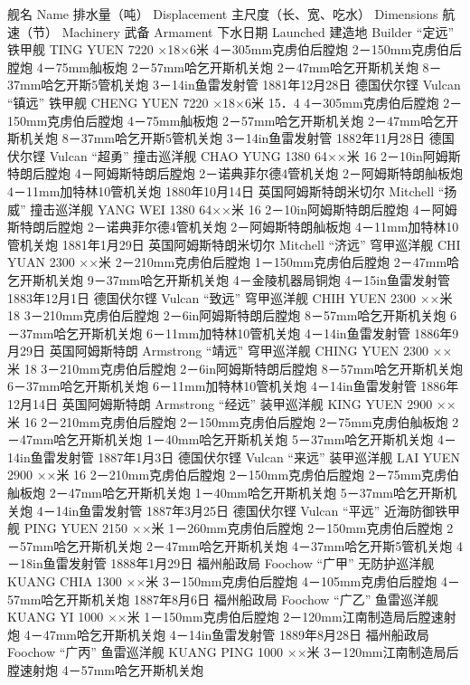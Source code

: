 \documentclass[12pt,UTF8]{ctexbook}
\begin{document}
舰名
Name 排水量（吨）
Displacement 主尺度（长、宽、吃水）
Dimensions 航速（节）
Machinery 武备
Armament 下水日期
Launched 建造地
Builder
“定远”
铁甲舰
TING YUEN 7220 ×18×6米 4－305mm克虏伯后膛炮
2－150mm克虏伯后膛炮
4－75mm舢板炮
2－57mm哈乞开斯机关炮
2－47mm哈乞开斯机关炮
8－37mm哈乞开斯5管机关炮
3－14in鱼雷发射管 1881年12月28日 德国伏尔铿
Vulcan
“镇远”
铁甲舰
CHENG YUEN 7220 ×18×6米 15．4 4－305mm克虏伯后膛炮
2－150mm克虏伯后膛炮
4－75mm舢板炮
2－57mm哈乞开斯机关炮
2－47mm哈乞开斯机关炮
8－37mm哈乞开斯5管机关炮
3－14in鱼雷发射管 1882年11月28日 德国伏尔铿
Vulcan
“超勇”
撞击巡洋舰
CHAO YUNG 1380 64××米 16 2－10in阿姆斯特朗后膛炮
4－阿姆斯特朗后膛炮
2－诺典菲尔德4管机关炮
2－阿姆斯特朗舢板炮
4－11mm加特林10管机关炮 1880年10月14日 英国阿姆斯特朗米切尔
Mitchell
“扬威”
撞击巡洋舰
YANG WEI 1380 64××米 16 2－10in阿姆斯特朗后膛炮
4－阿姆斯特朗后膛炮
2－诺典菲尔德4管机关炮
2－阿姆斯特朗舢板炮
4－11mm加特林10管机关炮 1881年1月29日 英国阿姆斯特朗米切尔
Mitchell
“济远”
穹甲巡洋舰
CHI YUAN 2300 ××米 2－210mm克虏伯后膛炮
1－150mm克虏伯后膛炮
2－47mm哈乞开斯机关炮
9－37mm哈乞开斯机关炮
4－金陵机器局铜炮
4－15in鱼雷发射管 1883年12月1日 德国伏尔铿
Vulcan
“致远”
穹甲巡洋舰
CHIH YUEN 2300 ××米 18 3－210mm克虏伯后膛炮
2－6in阿姆斯特朗后膛炮
8－57mm哈乞开斯机关炮
6－37mm哈乞开斯机关炮
6－11mm加特林10管机关炮
4－14in鱼雷发射管 1886年9月29日 英国阿姆斯特朗
Armstrong
“靖远”
穹甲巡洋舰
CHING YUEN 2300 ××米 18 3－210mm克虏伯后膛炮
2－6in阿姆斯特朗后膛炮
8－57mm哈乞开斯机关炮
6－37mm哈乞开斯机关炮
6－11mm加特林10管机关炮
4－14in鱼雷发射管 1886年12月14日 英国阿姆斯特朗
Armstrong
“经远”
装甲巡洋舰
KING YUEN 2900 ××米 16 2－210mm克虏伯后膛炮
2－150mm克虏伯后膛炮
2－75mm克虏伯舢板炮
2－47mm哈乞开斯机关炮
1－40mm哈乞开斯机关炮
5－37mm哈乞开斯机关炮
4－14in鱼雷发射管 1887年1月3日 德国伏尔铿
Vulcan
“来远”
装甲巡洋舰
LAI YUEN 2900 ××米 16 2－210mm克虏伯后膛炮
2－150mm克虏伯后膛炮
2－75mm克虏伯舢板炮
2－47mm哈乞开斯机关炮
1－40mm哈乞开斯机关炮
5－37mm哈乞开斯机关炮
4－14in鱼雷发射管 1887年3月25日 德国伏尔铿
Vulcan
“平远”
近海防御铁甲舰
PING YUEN 2150 ××米 1－260mm克虏伯后膛炮
2－150mm克虏伯后膛炮
2－57mm哈乞开斯机关炮
2－47mm哈乞开斯机关炮
4－37mm哈乞开斯5管机关炮
4－18in鱼雷发射管 1888年1月29日 福州船政局
Foochow
“广甲”
无防护巡洋舰
KUANG CHIA 1300 ××米 3－150mm克虏伯后膛炮
4－105mm克虏伯后膛炮
4－57mm哈乞开斯机关炮 1887年8月6日 福州船政局
Foochow
“广乙”
鱼雷巡洋舰
KUANG YI 1000 ××米 1－150mm克虏伯后膛炮
2－120mm江南制造局后膛速射炮
4－47mm哈乞开斯机关炮
4－14in鱼雷发射管 1889年8月28日 福州船政局
Foochow
“广丙”
鱼雷巡洋舰
KUANG PING 1000 ××米 3－120mm江南制造局后膛速射炮
4－57mm哈乞开斯机关炮
\end{document}
